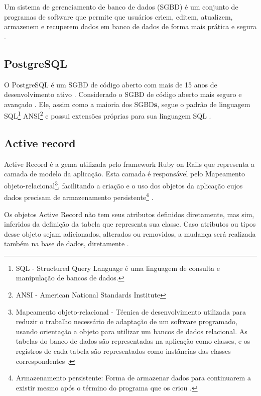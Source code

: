 Um sistema de gerenciamento de banco de dados (\gls{SGBD}) é um conjunto de programas de software que permite que usuários criem, editem, atualizem, armazenem e recuperem dados em banco de dados de forma mais prática e segura \cite{SGBD}. 

    \subsection{PostgreSQL}
    \label{subsec: PostgreSQL}
	
O PostgreSQL é um \gls{SGBD} de código aberto com mais de 15 anos de desenvolvimento ativo \cite{SobrePostgreSQL}. Considerado o \gls{SGBD} de código aberto mais seguro e avançado \cite{OverviewPostgreSQL}.
Ele, assim como a maioria dos \gls{SGBD}\textbf{s}, segue o padrão de linguagem SQL\footnote{SQL - Structured Query Language é uma linguagem de consulta e manipulação de bancos de dados.} ANSI\footnote{ANSI - American National Standards Institute} e possui extensões próprias para sua linguagem SQL \cite{SQLIntro}.

    \subsection{Active record}
    \label{subsec: ActiveRecord}

Active Record é a gema utilizada pelo framework Ruby on Rails que representa a camada de modelo da aplicação. Esta camada é responsável pelo Mapeamento objeto-relacional\footnote{Mapeamento objeto-relacional - Técnica de desenvolvimento utilizada para reduzir o trabalho necessário de adaptação de um software programado, usando orientação a objeto para utilizar um bancos de dados relacional. As tabelas do banco de dados são representadas na aplicação como classes, e os registros de cada tabela são representados como instâncias das classes correspondentes \cite{ORM}.}, facilitando a criação e o uso dos objetos da aplicação cujos dados precisam de armazenamento persistente\footnote{Armazenamento persistente: Forma de armazenar dados para continuarem a existir mesmo após o término do programa que os criou \cite{BDOO}.} \cite{ActiveRecordBasics}.

Os objetos Active Record não tem seus atributos definidos diretamente, mas sim, inferidos da definição da tabela que representa sua classe. Caso atributos ou tipos desse objeto sejam adicionados, alterados ou removidos, a mudança será realizada também na base de dados, diretamente \cite{ActiveRecordDocs}.